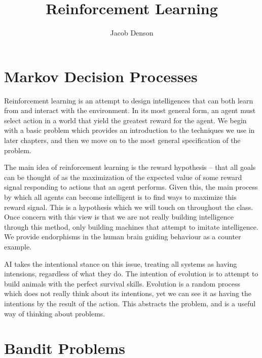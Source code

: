

\title{Reinforcement Learning}
\author{Jacob Denson}



\maketitle
\tableofcontents
{}

\chapter{Markov Decision Processes}

Reinforcement learning is an attempt to design intelligences that can both learn from and interact with the environment. In its most general form, an agent must select action in a world that yield the greatest reward for the agent. We begin with a basic problem which provides an introduction to the techniques we use in later chapters, and then we move on to the most general specification of the problem.

The main idea of reinforcement learning is the reward hypothesis -- that all goals can be thought of as the maximization of the expected value of some reward signal responding to actions that an agent performs. Given this, the main process by which all agents can become intelligent is to find ways to maximize this reward signal. This is a hypothesis which we will touch on throughout the class. Once concern with this view is that we are not really building intelligence through this method, only building machines that attempt to imitate intelligence. We provide endorphisms in the human brain guiding behaviour as a counter example.

AI takes the intentional stance on this issue, treating all systems as having intensions, regardless of what they do. The intention of evolution is to attempt to build animals with the perfect survival skills. Evolution is a random process which does not really think about its intentions, yet we can see it as having the intentions by the result of the action. This abstracts the problem, and is a useful way of thinking about problems.

\chapter{Bandit Problems}

